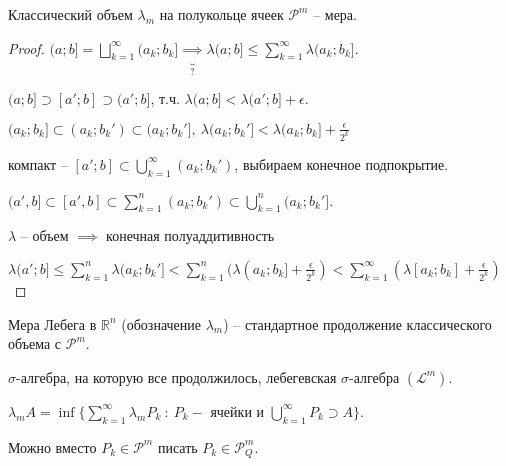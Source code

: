 
\begin{theorem}
    Классический объем $\lambda_m$ на полукольце ячеек $\mathcal{P}^m$ -- мера.
\end{theorem}

\begin{proof}
    $(a; b] = \bigsqcup_{k=1}^{\infty} (a_k; b_k] \underbrace{\implies}_{?} \lambda (a; b] \leq \sum_{k=1}^{\infty} \lambda (a_k; b_k]$.

    $(a; b] \supset [a'; b] \supset (a'; b]$, т.ч. $\lambda (a; b] < \lambda(a'; b] + \epsilon$.

    $(a_k; b_k] \subset (a_k; b_k') \subset (a_k; b_k'], \ \lambda (a_k; b_k'] < \lambda (a_k; b_k] + \frac{\epsilon}{2^k}$

    компакт -- $[a'; b] \subset \bigcup_{k=1}^{\infty} (a_k; b_k')$, выбираем конечное подпокрытие.


    $(a', b] \subset [a', b] \subset \sum_{k=1}^{n} (a_k; b_k') \subset \bigcup_{k=1}^{n} (a_k; b_k']$.

    $\lambda$ -- объем $\implies$ конечная полуаддитивность
    
    $\lambda (a'; b] \leq \sum_{k=1}^{n} \lambda (a_k; b_k'] < \sum_{k=1}^{n} (\lambda (a_k; b_k] + \frac{\epsilon}{2^k}) < \sum_{k=1}^{\infty} (\lambda [a_k; b_k] + \frac{\epsilon}{2^k})$

\end{proof}

\begin{definition}
    Мера Лебега в $\mathbb{R}^n$ (обозначение $\lambda_m$) -- стандартное продолжение классического объема с $\mathcal{P}^m$.

    $\sigma$-алгебра, на которую все продолжилось, лебегевская $\sigma$-алгебра $(\mathscr{L}^m)$. 
\end{definition}
\begin{remark}
    $\lambda_m A = \inf \{ \sum_{k=1}^{\infty} \lambda_m P_k \ : \ P_k - \text{ ячейки и } \bigcup_{k=1}^{\infty} P_k \supset A \}$.

    Можно вместо $P_k \in \mathcal{P}^m$ писать $P_k \in \mathcal{P}_Q^m$.
\end{remark}


